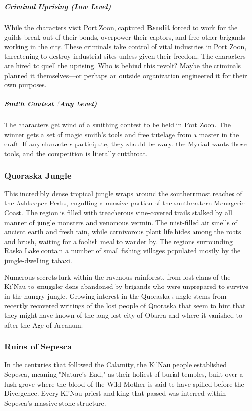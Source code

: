 \documentclass[10pt,a4paper,twoside,bg=print,twocolumn,openany,nodeprecatedcode]{dndbook}
\begin{document}
\subparagraph{Criminal Uprising (Low Level)}
While the characters visit Port Zoon, captured \textbf{Bandit} forced to work for the guilds break out of their bonds, overpower their captors, and free other brigands working in the city. These criminals take control of vital industries in Port Zoon, threatening to destroy industrial sites unless given their freedom. The characters are hired to quell the uprising. Who is behind this revolt? Maybe the criminals planned it themselves—or perhaps an outside organization engineered it for their own purposes.

\subparagraph{Smith Contest (Any Level)}
The characters get wind of a smithing contest to be held in Port Zoon. The winner gets a set of magic smith's tools and free tutelage from a master in the craft. If any characters participate, they should be wary: the Myriad wants those tools, and the competition is literally cutthroat.

\subsubsection{Quoraska Jungle}
This incredibly dense tropical jungle wraps around the southernmost reaches of the Ashkeeper Peaks, engulfing a massive portion of the southeastern Menagerie Coast. The region is filled with treacherous vine-covered trails stalked by all manner of jungle monsters and venomous vermin. The mist-filled air smells of ancient earth and fresh rain, while carnivorous plant life hides among the roots and brush, waiting for a foolish meal to wander by. The regions surrounding Raska Lake contain a number of small fishing villages populated mostly by the jungle-dwelling tabaxi.

Numerous secrets lurk within the ravenous rainforest, from lost clans of the Ki'Nau to smuggler dens abandoned by brigands who were unprepared to survive in the hungry jungle. Growing interest in the Quoraska Jungle stems from recently recovered writings of the lost people of Quoraska that seem to hint that they might have known of the long-lost city of Obarra and where it vanished to after the Age of Arcanum.

\subsubsection{Ruins of Sepesca}
In the centuries that followed the Calamity, the Ki'Nau people established Sepesca, meaning "Nature's End," as their holiest of burial temples, built over a lush grove where the blood of the Wild Mother is said to have spilled before the Divergence. Every Ki'Nau priest and king that passed was interred within Sepesca's massive stone structure.
\end{document}

